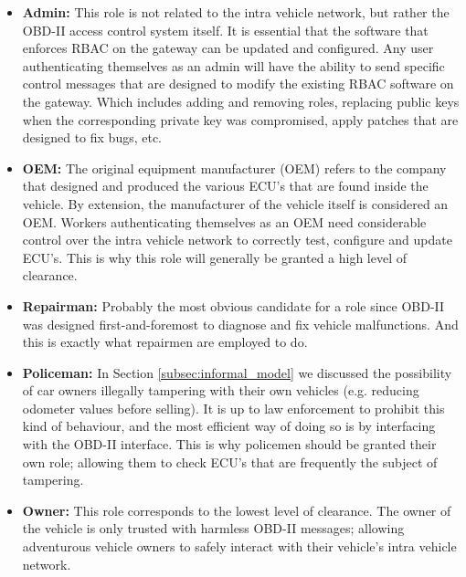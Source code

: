 \begin{itemize}
	\item \textbf{Admin:} This role is not related to the intra vehicle network, but rather the OBD-II access control system itself. It is essential that the software that enforces RBAC on the gateway can be updated and configured. Any user authenticating themselves as an admin will have the ability to send specific control messages that are designed to modify the existing RBAC software on the gateway. Which includes adding and removing roles, replacing public keys when the corresponding private key was compromised, apply patches that are designed to fix bugs, etc.
	
	\item \textbf{OEM:} The original equipment manufacturer (OEM) refers to the company that designed and produced the various ECU's that are found inside the vehicle. By extension, the manufacturer of the vehicle itself is considered an OEM. Workers authenticating themselves as an OEM need considerable control over the intra vehicle network to correctly test, configure and update ECU's. This is why this role will generally be granted a high level of clearance.
	
	\item \textbf{Repairman:} Probably the most obvious candidate for a role since OBD-II was designed first-and-foremost to diagnose and fix vehicle malfunctions. And this is exactly what repairmen are employed to do.
	
	\item \textbf{Policeman:} In Section \ref{subsec:informal_model} we discussed the possibility of car owners illegally tampering with their own vehicles (e.g. reducing odometer values before selling). It is up to law enforcement to prohibit this kind of behaviour, and the most efficient way of doing so is by interfacing with the OBD-II interface. This is why policemen should be granted their own role; allowing them to check ECU's that are frequently the subject of tampering.
	
	\item \textbf{Owner:} This role corresponds to the lowest level of clearance. The owner of the vehicle is only trusted with harmless OBD-II messages; allowing adventurous vehicle owners to safely interact with their vehicle's intra vehicle network.
\end{itemize}
